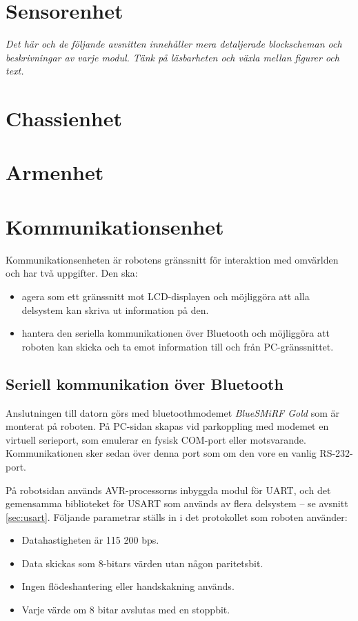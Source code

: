 \documentclass[a4paper,12pt]{article}
\begin{document}
\section{Sensorenhet}
\emph{Det här och de följande avsnitten innehåller mera detaljerade blockscheman och beskrivningar av varje modul.
Tänk på läsbarheten och växla mellan figurer och text.}
\section{Chassienhet}

\section{Armenhet}

\section{Kommunikationsenhet}
Kommunikationsenheten är robotens gränssnitt för interaktion med omvärlden och har två uppgifter. Den ska:
\begin{itemize}
\item agera som ett gränssnitt mot LCD-displayen och möjliggöra att alla delsystem kan skriva ut information på den.
\item hantera den seriella kommunikationen över Bluetooth och möjliggöra att roboten kan skicka och ta emot information till och från PC-gränssnittet.
\end{itemize}

\subsection{Seriell kommunikation över Bluetooth}
Anslutningen till datorn görs med bluetoothmodemet \emph{BlueSMiRF Gold} som är monterat på roboten. På PC-sidan skapas vid parkoppling med modemet en virtuell serieport, som emulerar en fysisk COM-port eller motsvarande. Kommunikationen sker sedan över denna port som om den vore en vanlig RS-232-port. 

På robotsidan används AVR-processorns inbyggda modul för UART, och det gemensamma biblioteket för USART som används av flera delsystem -- se avsnitt \ref{sec:usart}. Följande parametrar ställs in i det protokollet som roboten använder:
\begin{itemize}
\item Datahastigheten är 115 200 bps.
\item Data skickas som 8-bitars värden utan någon paritetsbit.
\item Ingen flödeshantering eller handskakning används.
\item Varje värde om 8 bitar avslutas med en stoppbit.
\end{itemize}
\end{document}
